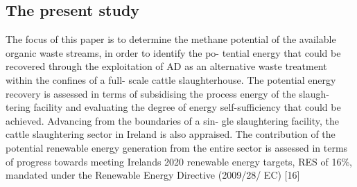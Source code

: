 \subsection{The present study}
The focus of this paper is to determine the methane potential of the available organic waste streams, in order to identify the po- tential energy that could be recovered through the exploitation of AD as an alternative waste treatment within the confines of a full- scale cattle slaughterhouse. The potential energy recovery is assessed in terms of subsidising the process energy of the slaugh- tering facility and evaluating the degree of energy self-sufficiency that could be achieved. Advancing from the boundaries of a sin- gle slaughtering facility, the cattle slaughtering sector in Ireland is also appraised. The contribution of the potential renewable energy generation from the entire sector is assessed in terms of progress towards meeting Irelands 2020 renewable energy targets, RES of 16\%, mandated under the Renewable Energy Directive (2009/28/ EC) [16]